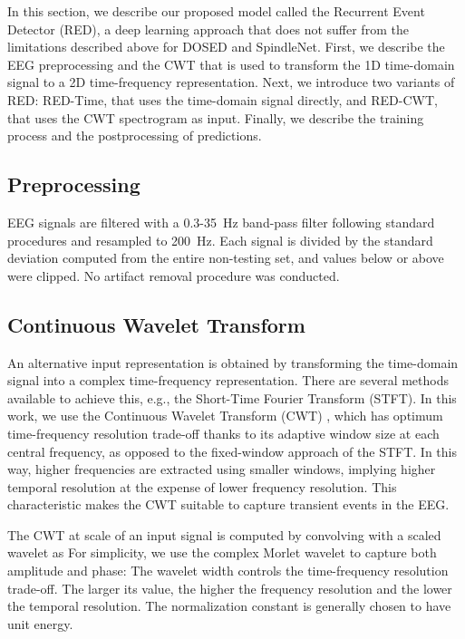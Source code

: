 \documentclass[conference]{IEEEtran}
\begin{document}
In this section, we describe our proposed model called the Recurrent Event Detector (RED), a deep learning approach that does not suffer from the limitations described above for DOSED and SpindleNet. First, we describe the EEG preprocessing and the CWT \cite{addison2017illustrated} that is used to transform the 1D time-domain signal to a 2D time-frequency representation. Next, we introduce two variants of RED: RED-Time, that uses the time-domain signal directly, and RED-CWT, that uses the CWT spectrogram as input. Finally, we describe the training process and the postprocessing of predictions.

\subsection{Preprocessing}
\label{sec:preprocessing}

EEG signals are filtered with a 0.3-35~Hz band-pass filter following standard procedures \cite{berry2012aasm} and resampled to 200~Hz. Each signal is divided by the standard deviation computed from the entire non-testing set, and values below  or above  were clipped. No artifact removal procedure was conducted.


\subsection{Continuous Wavelet Transform}
\label{sec:cwt}

An alternative input representation is obtained by transforming the time-domain signal into a complex time-frequency representation. There are several methods available to achieve this, e.g., the Short-Time Fourier Transform (STFT). In this work, we use the Continuous Wavelet Transform (CWT) \cite{addison2017illustrated} , which has optimum time-frequency resolution trade-off thanks to its adaptive window size at each central frequency, as opposed to the fixed-window approach of the STFT. In this way, higher frequencies are extracted using smaller windows, implying higher temporal resolution at the expense of lower frequency resolution. This characteristic makes the CWT suitable to capture transient events in the EEG.

The CWT at scale  of an input signal  is computed by convolving  with a scaled wavelet  as
For simplicity, we use the complex Morlet wavelet to capture both amplitude and phase:
The wavelet width  controls the time-frequency resolution trade-off. The larger its value, the higher the frequency resolution and the lower the temporal resolution. The normalization constant  is generally chosen to have unit energy.
\end{document}
